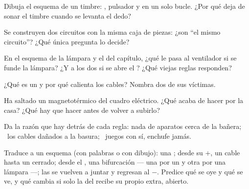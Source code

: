 \begin{exercise}[$\star$]\label{exo:g6:circuits-and-safety:3}
Dibuja el esquema de un timbre: , pulsador y
 en un solo bucle. ¿Por qué deja de sonar el timbre cuando
se levanta el dedo?
\end{exercise}

\begin{exercise}[$\star$]\label{exo:g6:circuits-and-safety:4}
Se construyen dos circuitos con la misma caja de piezas: ¿son ``el
mismo circuito''? ¿Qué única pregunta lo decide?
\end{exercise}

\begin{exercise}[$\star$]\label{exo:g6:circuits-and-safety:5}
En el esquema de la lámpara y el  del capítulo, ¿qué le pasa al
ventilador si se funde la lámpara? ¿Y a los dos si se abre el
? ¿Qué viejas reglas responden?
\end{exercise}

\begin{exercise}[$\star$]\label{exo:g6:circuits-and-safety:6}
¿Qué es un  y por qué calienta los cables? Nombra
dos de sus víctimas.
\end{exercise}

\begin{exercise}[$\star$]\label{exo:g6:circuits-and-safety:7}
Ha saltado un magnetotérmico del cuadro eléctrico. ¿Qué acaba de hacer
por la casa? ¿Qué hay que hacer antes de volver a subirlo?
\end{exercise}

\begin{exercise}[$\star$]\label{exo:g6:circuits-and-safety:8}
Da la razón que hay detrás de cada regla: nada de aparatos cerca de la
bañera; \ los cables dañados a la basura; \ juegos con  sí,
enchufe jamás.
\end{exercise}

\begin{exercise}[$\star\star$]\label{exo:g6:circuits-and-safety:9}
Traduce a un esquema (con palabras o con dibujo): una ; desde su
$+$, un cable hasta un  cerrado; desde el
, una bifurcación --- una  por un
 y otra por una lámpara ---; las  se vuelven a
juntar y regresan al $-$. Predice qué se oye y qué se ve, y qué cambia
si solo la  del  recibe su propio
 extra, abierto.
\end{exercise}

